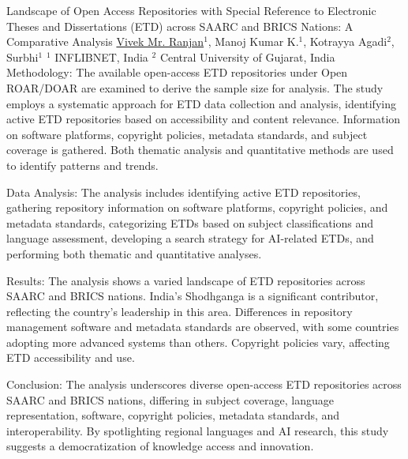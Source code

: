 \begin{abstract_online}{Landscape of Open Access Repositories with Special Reference to Electronic Theses and Dissertations (ETD) across SAARC and BRICS Nations: A Comparative Analysis}{%
    \underline{Vivek Mr. Ranjan}$^{1}$, Manoj Kumar K.$^{1}$, Kotrayya Agadi$^{2}$, Surbhi$^{1}$}{%
    }{%
    $^1$ INFLIBNET, India \newline{}%
    $^2$ Central University of Gujarat, India%
}
Methodology: The available open-access ETD repositories under Open ROAR/DOAR are examined to derive the sample size for analysis. The study employs a systematic approach for ETD data collection and analysis, identifying active ETD repositories based on accessibility and content relevance. Information on software platforms, copyright policies, metadata standards, and subject coverage is gathered. Both thematic analysis and quantitative methods are used to identify patterns and trends.

Data Analysis: The analysis includes identifying active ETD repositories, gathering repository information on software platforms, copyright policies, and metadata standards, categorizing ETDs based on subject classifications and language assessment, developing a search strategy for AI-related ETDs, and performing both thematic and quantitative analyses.

Results: The analysis shows a varied landscape of ETD repositories across SAARC and BRICS nations. India's Shodhganga is a significant contributor, reflecting the country's leadership in this area. Differences in repository management software and metadata standards are observed, with some countries adopting more advanced systems than others. Copyright policies vary, affecting ETD accessibility and use.

Conclusion: The analysis underscores diverse open-access ETD repositories across SAARC and BRICS nations, differing in subject coverage, language representation, software, copyright policies, metadata standards, and interoperability. By spotlighting regional languages and AI research, this study suggests a democratization of knowledge access and innovation.

\end{abstract_online}


